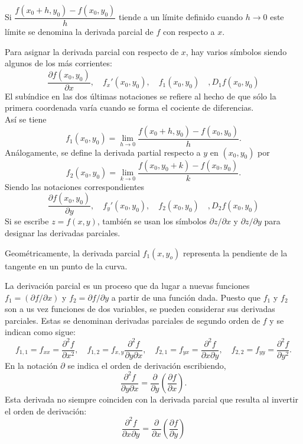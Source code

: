 \begin{tcolorbox}
    Si $\dfrac{f(x_0+h,y_0)-f(x_0,y_0)}{h}$ tiende a un límite definido cuando $h\to 0$ este límite se denomina la derivada parcial de $f$ con respecto a $x$.
\end{tcolorbox}

\begin{tcolorbox}
    Para asignar la derivada parcial con respecto de $x$, hay varios símbolos siendo algunos de los más corrientes:
    $$\dfrac{\partial f(x_0,y_0)}{\partial x},\quad f_x'(x_0,y_0),\quad f_1(x_0,y_0)\quad, D_1f(x_0,y_0)$$
    El subíndice en las dos últimas notaciones se refiere al hecho de que sólo la primera coordenada varía cuando se forma el cociente de diferencias.\\
    Así se tiene
    $$f_1(x_0,y_0)=\lim_{h\to 0}\dfrac{f(x_0+h,y_0)-f(x_0,y_0)}{h}.$$
    Análogamente, se define la derivada partial respecto a $y$ en $(x_0,y_0)$ por
    $$f_2(x_0,y_0)=\lim_{k\to 0}\dfrac{f(x_0,y_0+k)-f(x_0,y_0)}{k}.$$
    Siendo las notaciones correspondientes
    $$\dfrac{\partial f(x_0,y_0)}{\partial y},\quad f_y'(x_0,y_0),\quad f_2(x_0,y_0)\quad, D_2f(x_0,y_0)$$
    Si se escribe $z=f(x,y)$, también se usan los símbolos $\partial z/\partial x$ y $\partial z / \partial y$ para designar las derivadas parciales.
\end{tcolorbox}

\begin{tcolorbox}
    Geométricamente, la derivada parcial $f_1(x,y_o)$ representa la pendiente de la tangente en un punto de la curva.
\end{tcolorbox}

\begin{tcolorbox}
    La derivación parcial es un proceso que da lugar a nuevas funciones $f_1=(\partial f/\partial x)$ y $f_2=\partial f/\partial y$ a partir de una función dada. Puesto que $f_1$ y $f_2$ son a us vez funciones de dos variables, se pueden considerar sus derivadas parciales. Estas se denominan derivadas parciales de segundo orden de $f$ y se indican como sigue:
    $$f_{1,1}=f_{xx}=\dfrac{\partial^2 f}{\partial x^2},\quad f_{1,2}=f_{x,y}\dfrac{\partial^2 f}{\partial y \partial x}, \quad f_{2,1}=f_{yx}=\dfrac{\partial^2 f}{\partial x \partial y}, \quad f_{2,2}=f_{yy}=\dfrac{\partial^2 f}{\partial y^2}.$$
    En la notación $\partial$ se indica el orden de derivación escribiendo,
    $$\dfrac{\partial^2 f}{\partial y \partial x}=\dfrac{\partial}{\partial y}\left(\dfrac{\partial f}{\partial x}\right).$$
    Esta derivada no siempre coinciden con la derivada parcial que resulta al invertir el orden de derivación:
    $$\dfrac{\partial^2 f}{\partial x\partial y}=\dfrac{\partial}{\partial x}\left(\dfrac{\partial f}{\partial y}\right)$$
\end{tcolorbox}



